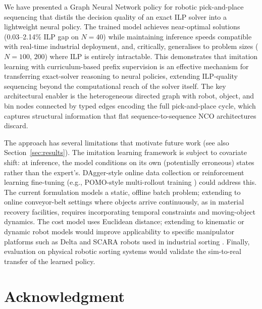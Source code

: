 \documentclass[conference]{IEEEtran}
\begin{document}
We have presented a Graph Neural Network policy for robotic pick-and-place sequencing that distils the decision quality of an exact ILP solver into a lightweight neural policy. The trained model achieves near-optimal solutions (0.03--2.14\% ILP gap on $N{=}40$) while maintaining inference speeds compatible with real-time industrial deployment, and, critically, generalises to problem sizes ($N{=}100$, $200$) where ILP is entirely intractable. This demonstrates that imitation learning with curriculum-based prefix supervision is an effective mechanism for transferring exact-solver reasoning to neural policies, extending ILP-quality sequencing beyond the computational reach of the solver itself. The key architectural enabler is the heterogeneous directed graph with robot, object, and bin nodes connected by typed edges encoding the full pick-and-place cycle, which captures structural information that flat sequence-to-sequence NCO architectures discard.

The approach has several limitations that motivate future work (see also Section~\ref{sec:results}). The imitation learning framework is subject to covariate shift: at inference, the model conditions on its own (potentially erroneous) states rather than the expert's. DAgger-style online data collection \cite{ross2011dagger} or reinforcement learning fine-tuning (e.g., POMO-style multi-rollout training \cite{kwon2020pomo}) could address this. The current formulation models a static, offline batch problem; extending to online conveyor-belt settings where objects arrive continuously, as in material recovery facilities, requires incorporating temporal constraints and moving-object dynamics. The cost model uses Euclidean distance; extending to kinematic or dynamic robot models would improve applicability to specific manipulator platforms such as Delta and SCARA robots used in industrial sorting \cite{han2019pap}. Finally, evaluation on physical robotic sorting systems would validate the sim-to-real transfer of the learned policy.

\section*{Acknowledgment}
\end{document}
